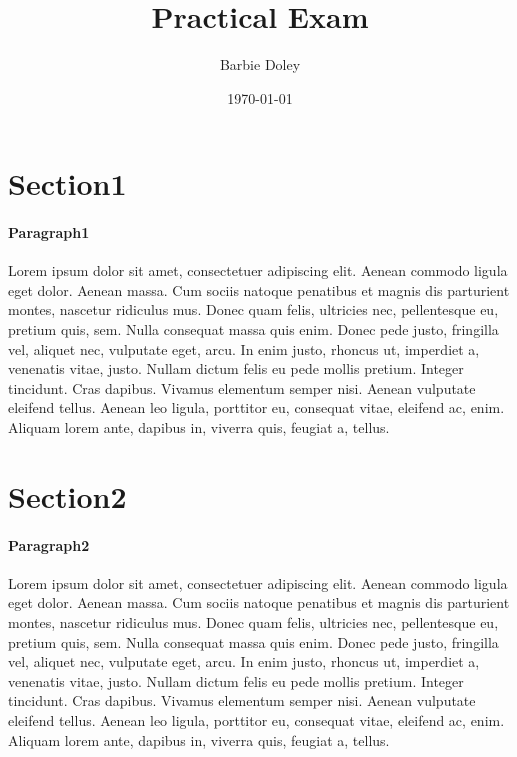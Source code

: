\documentclass{article}
\title{Practical Exam}
\author{Barbie Doley}
\date{\today}
\begin{document}
\maketitle

\thispagestyle{fancy}

\section{Section1}
\paragraph{Paragraph1}
Lorem ipsum dolor sit amet, consectetuer adipiscing elit. Aenean commodo ligula eget dolor. Aenean massa. Cum sociis natoque penatibus et magnis dis parturient montes, nascetur ridiculus mus. Donec quam felis, ultricies nec, pellentesque eu, pretium quis, sem. Nulla consequat massa quis enim. Donec pede justo, fringilla vel, aliquet nec, vulputate eget, arcu. In enim justo, rhoncus ut, imperdiet a, venenatis vitae, justo. Nullam dictum felis eu pede mollis pretium. Integer tincidunt. Cras dapibus. Vivamus elementum semper nisi. Aenean vulputate eleifend tellus. Aenean leo ligula, porttitor eu, consequat vitae, eleifend ac, enim. Aliquam lorem ante, dapibus in, viverra quis, feugiat a, tellus.

\section{Section2}
\paragraph{Paragraph2}
Lorem ipsum dolor sit amet, consectetuer adipiscing elit. Aenean commodo ligula eget dolor. Aenean massa. Cum sociis natoque penatibus et magnis dis parturient montes, nascetur ridiculus mus. Donec quam felis, ultricies nec, pellentesque eu, pretium quis, sem. Nulla consequat massa quis enim. Donec pede justo, fringilla vel, aliquet nec, vulputate eget, arcu. In enim justo, rhoncus ut, imperdiet a, venenatis vitae, justo. Nullam dictum felis eu pede mollis pretium. Integer tincidunt. Cras dapibus. Vivamus elementum semper nisi. Aenean vulputate eleifend tellus. Aenean leo ligula, porttitor eu, consequat vitae, eleifend ac, enim. Aliquam lorem ante, dapibus in, viverra quis, feugiat a, tellus.
\end{document}

